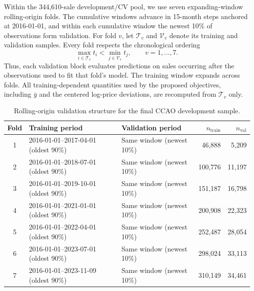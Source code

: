 \documentclass[10pt]{article}
\theoremstyle{definition}
\newcommand{\1}{\mathbf{1}}
\begin{document}
{{%

\textcolor{impGreen}{Within the 344,610-sale development/CV pool, we use seven expanding-window rolling-origin folds. The cumulative windows advance in 15-month steps anchored at 2016-01-01, and within each cumulative window the newest 10\% of observations form validation. For fold $v$, let $\mathcal T_v$ and $\mathcal V_v$ denote its training and validation samples. Every fold respects the chronological ordering}
{\color{impGreen}
\begin{equation}
\label{eq:temporal_ordering}
\max_{i\in\mathcal T_v} t_i
<
\min_{j\in\mathcal V_v} t_j,
\qquad v=1,\ldots,7.
\end{equation}
}
\textcolor{impGreen}{Thus, each validation block evaluates predictions on sales occurring after the observations used to fit that fold's model. The training window expands across folds. All training-dependent quantities used by the proposed objectives, including $\bar y$ and the centered log-price deviations, are recomputed from $\mathcal T_v$ only.}

\textcolor{impGreen}{}

\begin{table}[!ht]
\centering
\caption{Rolling-origin validation structure for the final CCAO development sample.}
\label{tab:fold_structure}
\begin{tabular}{cllrr}
\toprule
Fold & Training period & Validation period & $n_{\mathrm{train}}$ & $n_{\mathrm{val}}$ \\
\midrule
1 & 2016-01-01--2017-04-01 (oldest 90\%) & Same window (newest 10\%) & 46,888 & 5,209 \\
2 & 2016-01-01--2018-07-01 (oldest 90\%) & Same window (newest 10\%) & 100,776 & 11,197 \\
3 & 2016-01-01--2019-10-01 (oldest 90\%) & Same window (newest 10\%) & 151,187 & 16,798 \\
4 & 2016-01-01--2021-01-01 (oldest 90\%) & Same window (newest 10\%) & 200,908 & 22,323 \\
5 & 2016-01-01--2022-04-01 (oldest 90\%) & Same window (newest 10\%) & 252,487 & 28,054 \\
6 & 2016-01-01--2023-07-01 (oldest 90\%) & Same window (newest 10\%) & 298,024 & 33,113 \\
7 & 2016-01-01--2023-11-09 (oldest 90\%) & Same window (newest 10\%) & 310,149 & 34,461 \\
\bottomrule
\end{tabular}
\end{table}

}}
\end{document}
